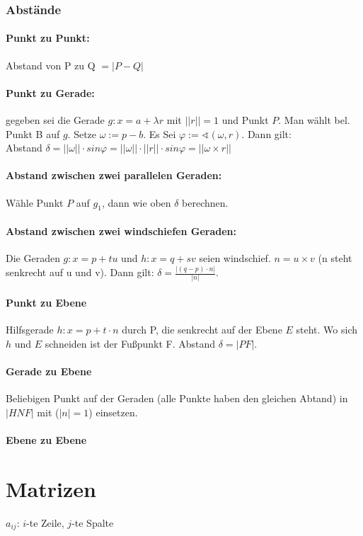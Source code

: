\documentclass[a4paper, twocolumn]{article}
\begin{document}
       
   
   \subsubsection{Abstände}
      \paragraph{Punkt zu Punkt:}
      Abstand von P zu Q $= |P-Q|$
      
      \paragraph{Punkt zu Gerade:}
      gegeben sei die Gerade $g\colon x = a + \lambda r$ mit $||r|| = 1$ und Punkt $P$. 
      Man wählt bel. Punkt B auf $g$. Setze $\omega := p-b$. 
      Es Sei $\varphi := \sphericalangle(\omega, r)$. Dann gilt:\\
      Abstand $\delta = ||\omega|| \cdot sin \varphi = ||\omega|| \cdot ||r|| \cdot sin \varphi = ||\omega \times r||$
      
      \paragraph{Abstand zwischen zwei parallelen Geraden:}
      Wähle Punkt $P$ auf $g_1$, dann wie oben $\delta$ berechnen.

      \paragraph{Abstand zwischen zwei windschiefen Geraden:}
      Die Geraden $g: x = p +  tu$ und $h: x = q + sv$ seien windschief. $n = u \times v$ (n steht senkrecht auf u und v). Dann gilt: $\delta = \frac{|(q-p) \cdot n|}{|n|}$.

      \paragraph{Punkt zu Ebene}      
      Hilfsgerade $h: x = p + t \cdot n$ durch P, die senkrecht auf der Ebene $E$ steht. Wo sich $h$ und $E$ schneiden ist der Fußpunkt F. Abstand $\delta = |PF|$.

      \paragraph{Gerade zu Ebene}
      Beliebigen Punkt auf der Geraden (alle Punkte haben den gleichen Abtand) in $|HNF|$ mit ($|n| = 1$) einsetzen.
      
      \paragraph{Ebene zu Ebene}

\section{Matrizen}
	$a_{ij}$: $i$-te Zeile, $j$-te Spalte
	
\end{document}
